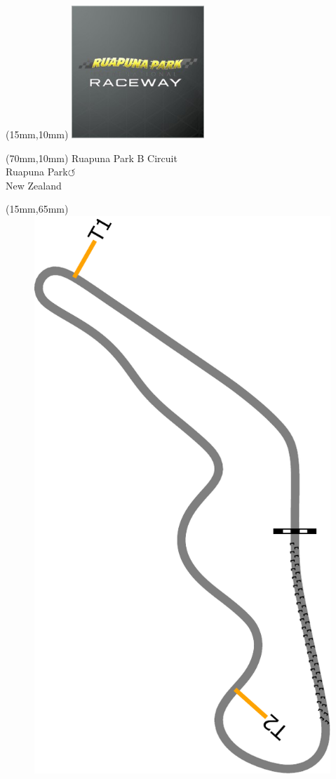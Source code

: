 \null\newpage
\begin{textblock*}{50mm}(15mm,10mm)%
\includegraphics[width=50mm]{LG/RUPU.png}
\end{textblock*}
\begin{textblock*}{130mm}(70mm,10mm)%
{\fontsize{20}{20}\selectfont Ruapuna Park B Circuit\\}
{\fontsize{16}{16}\selectfont Ruapuna Park\hfill \huge$\circlearrowleft$\\}
{\fontsize{12}{12}\selectfont New Zealand\\}
\end{textblock*}
\begin{textblock*}{185mm}(15mm,65mm)%
\centering
\mbox{\includegraphics[width=185mm,height=210mm,keepaspectratio]{PT/RPBC.pdf}}
\end{textblock*}

